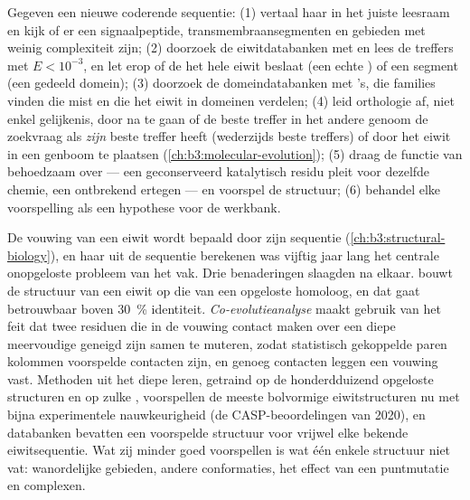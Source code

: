 \begin{method}\label{met:b3:bioinformatics:annotate}
Gegeven een nieuwe coderende sequentie: (1) vertaal haar in het juiste
leesraam en kijk of er een signaalpeptide, transmembraansegmenten en
gebieden met weinig complexiteit zijn; (2) doorzoek de
eiwitdatabanken met  en lees de treffers met $E < 10^{-3}$, en let
erop of de  het hele eiwit beslaat (een echte ) of
een segment (een gedeeld domein); (3) doorzoek de domeindatabanken met
's, die families vinden die  mist en die het eiwit in
domeinen verdelen; (4) leid orthologie af, niet enkel gelijkenis, door
na te gaan of de beste treffer in het andere genoom de zoekvraag als
\emph{zijn} beste treffer heeft (wederzijds beste treffers) of door het
eiwit in een genboom te plaatsen (\cref{ch:b3:molecular-evolution});
(5) draag de functie van  behoedzaam over --- een
geconserveerd katalytisch residu pleit voor dezelfde chemie, een
ontbrekend ertegen --- en voorspel de structuur; (6) behandel elke
voorspelling als een hypothese voor de werkbank.
\end{method}

\begin{proposition}\label{prop:b3:bioinformatics:structure}
De vouwing van een eiwit wordt bepaald door zijn sequentie
(\cref{ch:b3:structural-biology}), en haar uit de sequentie berekenen
was vijftig jaar lang het centrale onopgeloste probleem van het vak.
Drie benaderingen slaagden na elkaar. \emph{} bouwt
de structuur van een eiwit op die van een opgeloste homoloog, en dat
gaat betrouwbaar boven \qty{30}{\%} identiteit. \emph{Co-evolutieanalyse}
maakt gebruik van het feit dat twee residuen die in de vouwing contact
maken over een diepe meervoudige  geneigd zijn samen te
muteren, zodat statistisch gekoppelde paren kolommen voorspelde
contacten zijn, en genoeg contacten leggen een vouwing vast. Methoden
uit het diepe leren, getraind op de honderdduizend opgeloste structuren
en op zulke , voorspellen de meeste bolvormige
eiwitstructuren nu met bijna experimentele nauwkeurigheid (de
CASP-beoordelingen van 2020), en databanken bevatten een voorspelde
structuur voor vrijwel elke bekende eiwitsequentie. Wat zij minder goed
voorspellen is wat één enkele structuur niet vat: wanordelijke
gebieden, andere conformaties, het effect van een puntmutatie en
complexen.
\end{proposition}


